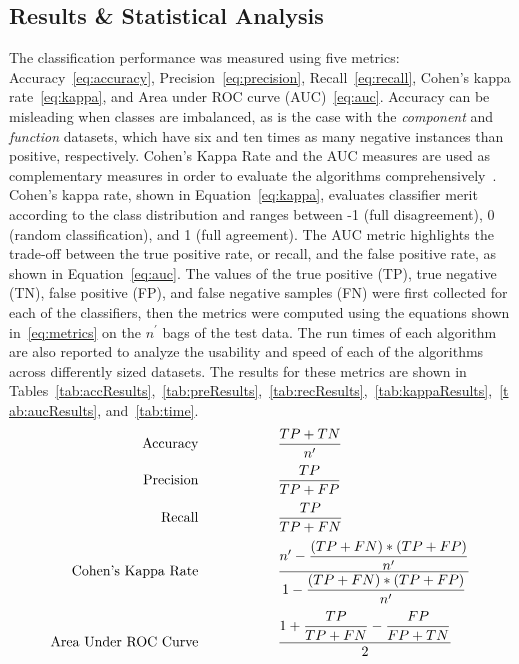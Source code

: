 \subsection{Results \& Statistical Analysis}\label{subsec:results}
The classification performance was measured using five metrics: Accuracy~\eqref{eq:accuracy}, Precision~\eqref{eq:precision}, Recall~\eqref{eq:recall}, Cohen's kappa rate~\eqref{eq:kappa}, and Area under ROC curve (AUC)~\eqref{eq:auc}. Accuracy can be misleading when classes are imbalanced, as is the case with the \textit{component} and \textit{function} datasets, which have six and ten times as many negative instances than positive, respectively. Cohen's Kappa Rate and the AUC measures are used as complementary measures in order to evaluate the algorithms comprehensively~\citep{Bendavid2008}. Cohen's kappa rate, shown in Equation~\eqref{eq:kappa}, evaluates classifier merit according to the class distribution and ranges between -1 (full disagreement), 0 (random classification), and 1 (full agreement). The AUC metric highlights the trade-off between the true positive rate, or recall, and the false positive rate, as shown in Equation~\eqref{eq:auc}. The values of the true positive (TP), true negative (TN), false positive (FP), and false negative samples (FN) were first collected for each of the classifiers, then the metrics were computed using the equations shown in~\eqref{eq:metrics} on the $n^\prime$ bags of the test data. The run times of each algorithm are also reported to analyze the usability and speed of each of the algorithms across differently sized datasets. The results for these metrics are shown in Tables~\ref{tab:accResults},~\ref{tab:preResults},~\ref{tab:recResults},~\ref{tab:kappaResults},~\ref{tab:aucResults}, and~\ref{tab:time}.
\begin{subequations}
\label{eq:metrics}
\begin{align}
\text{Accuracy} \tab \tab &\dfrac{TP+TN}{n^\prime} \label{eq:accuracy}\\[1.5pt]
\text{Precision} \tab \tab &\dfrac{TP}{TP+FP} \label{eq:precision}\\[1.5pt]
\text{Recall} \tab \tab &\dfrac{TP}{TP+FN} \label{eq:recall}\\[1.5pt]
\text{Cohen's Kappa Rate} \tab \tab &\dfrac{n^\prime - \dfrac{(TP+FN)*(TP+FP)}{n^\prime}}{1 - \dfrac{(TP+FN)*(TP+FP)}{n^\prime}} \label{eq:kappa}\\[1.5pt]
\text{Area Under ROC Curve} \tab \tab &\frac{1 + \dfrac{TP}{TP+FN} - \dfrac{FP}{FP+TN}}{2} \label{eq:auc}
\end{align}
\end{subequations}

